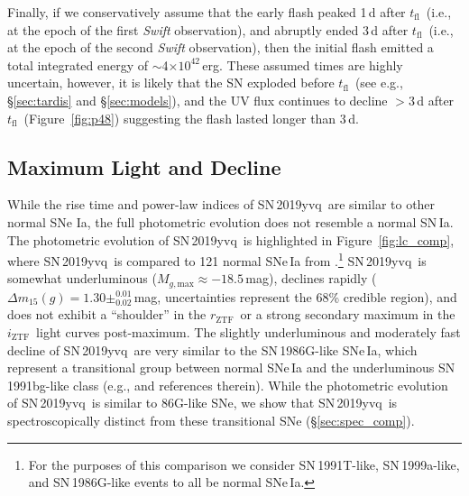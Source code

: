 \documentclass[twocolumn]{aastex63}
\newcommand{\rztf}{$r_\mathrm{ZTF}$}
\newcommand{\iztf}{$i_\mathrm{ZTF}$}
\newcommand{\tfl}{$t_\mathrm{fl}$}
\newcommand{\sn}{SN\,2019yvq}
\begin{document}
Finally, if we conservatively assume that the early flash peaked 1\,d after
\tfl\ (i.e., at the epoch of the first \textit{Swift} observation), and
abruptly ended 3\,d after \tfl\ (i.e., at the epoch of the second
\textit{Swift} observation), then the initial flash emitted a total integrated
energy of $\sim$4$\times 10^{42}$\,erg.
These assumed times are highly uncertain, however, it is likely that the SN
exploded before \tfl\ (see e.g., \S\ref{sec:tardis} and \S\ref{sec:models}),
and the UV flux continues to decline $>$3\,d after \tfl\
(Figure~\ref{fig:p48}) suggesting the flash lasted longer than 3\,d.

\subsection{Maximum Light and Decline}\label{sec:max_decline}

While the rise time and power-law indices of \sn\ are similar to other normal
SNe Ia, the full photometric evolution does not resemble a normal SN\,Ia. The
photometric evolution of \sn\ is highlighted in Figure~\ref{fig:lc_comp},
where \sn\ is compared to 121 normal SNe\,Ia from \citet{Yao19}.\footnote{For
the purposes of this comparison we consider SN\,1991T-like, SN\,1999a-like,
and SN\,1986G-like events to all be normal SNe\,Ia.} \sn\ is somewhat
underluminous ($M_{g,\mathrm{max}} \approx -18.5$\,mag), declines rapidly
($\Delta m_{15}(g) = 1.30\pm^{0.01}_{0.02}$\,mag, uncertainties represent the
68\% credible region), and does not exhibit a ``shoulder'' in the \rztf\ or a
strong secondary maximum in the \iztf\ light curves post-maximum. The slightly
underluminous and moderately fast decline of \sn\ are very similar to the
SN\,1986G-like SNe\,Ia, which represent a transitional group between normal
SNe\,Ia and the underluminous SN\,1991bg-like class (e.g.,
\citealt{Taubenberger17} and references therein). While the photometric
evolution of \sn\ is similar to 86G-like SNe, we show that \sn\ is
spectroscopically distinct from these transitional SNe
(\S\ref{sec:spec_comp}).
\end{document}
